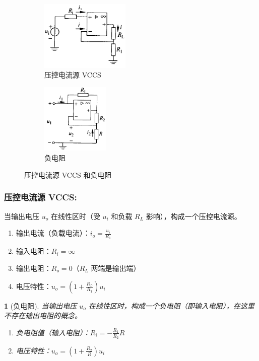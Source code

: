 \documentclass[UTF8]{report}
\theoremstyle{MyLineTheoremStyle} %
\theoremstyle{MyBlockTheoremStyle} %
\theoremstyle{MySubsubsectionStyle} %
\newtheorem{definition}{}
\begin{document}
\begin{figure}[H]\centering
\begin{subfigure}[t]{0.37\textwidth}\centering
    \includegraphics[height=95pt]{assets/1,2/压控电流源.png}
    \caption{ 压控电流源 VCCS}
\end{subfigure}\begin{subfigure}[t]{0.37\textwidth}\centering
    \includegraphics[height=95pt]{assets/1,2/负电阻.png}
    \caption{  负电阻}
\end{subfigure}
\caption{ 压控电流源 VCCS 和负电阻 }
\end{figure}


\subsubsection{压控电流源 VCCS: }
当输出电压 $u_o$ 在线性区时（受 $u_i$ 和负载 $R_L$ 影响），构成一个压控电流源。
\begin{enumerate}
\item 输出电流（负载电流）：$i_o = \frac{u_i}{R_1}$
\item 输入电阻：$R_i = \infty$
\item 输出电阻：$R_o =  0$（$R_L$ 两端是输出端）
\item 电压特性：$u_o = (1+\frac{R_L}{R_1})u_i$
\end{enumerate}


\begin{definition}[负电阻]
当输出电压 $u_o$ 在线性区时，构成一个负电阻（即输入电阻），在这里不存在输出电阻的概念。
\begin{enumerate}
\item 负电阻值（输入电阻）：$R_i = -\frac{R_1}{R_2}R$
\item 电压特性：$u_o = (1+\frac{R_2}{R})u_i$
\end{enumerate}
\end{definition}
\end{document}
